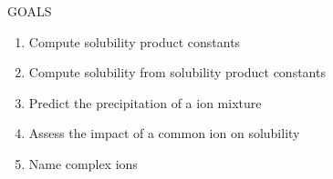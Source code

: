 \documentclass[main.tex]{subfiles}
\begin{document}
\begin{marginfigure}%
\begin{mytcbox}{GOALS}

\begin{enumerate}[label=\protect\circled{\color{white}\arabic*}]
\item Compute solubility product constants
\item Compute solubility from solubility product constants
\item Predict the precipitation of a ion mixture
\item Assess the impact of a common ion on solubility
\item Name complex ions
\end{enumerate}
\end{mytcbox}
\vspace{1cm}
\begin{tcolorbox}[enhanced,colback=red!5!white,colframe=black!50!red,boxrule=1pt,
  arc=0pt,outer arc=0pt,drop heavy lifted shadow]
\faGears\ 
 {\discussionSOLUBLE} \end{tcolorbox}

\end{marginfigure}%
\end{document}
